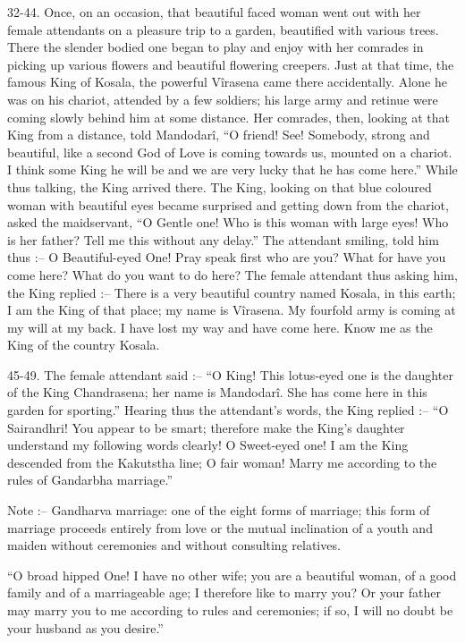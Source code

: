 32-44. Once, on an occasion, that beautiful faced woman went out with her female attendants on a pleasure trip to a garden, beautified with various trees. There the slender bodied one began to play and enjoy with her comrades in picking up various flowers and beautiful flowering creepers. Just at that time, the famous King of Kosala, the powerful V\^irasena came there accidentally. Alone he was on his chariot, attended by a few soldiers; his large army and retinue were coming slowly behind him at some distance. Her comrades, then, looking at that King from a distance, told Mandodar\^i, ``O friend! See! Somebody, strong and beautiful, like a second God of Love is coming towards us, mounted on a chariot. I think some King he will be and we are very lucky that he has come here.'' While thus talking, the King arrived there. The King, looking on that blue coloured woman with beautiful eyes became surprised and getting down from the chariot, asked the maidservant, ``O Gentle one! Who is this woman with large eyes! Who is her father? Tell me this without any delay.'' The attendant smiling, told him thus :-- O Beautiful-eyed One! Pray speak first who are you? What for have you come here? What do you want to do here? The female attendant thus asking him, the King replied :-- There is a very beautiful country named Kosala, in this earth; I am the King of that place; my name is V\^irasena. My fourfold army is coming at my will at my back. I have lost my way and have come here. Know me as the King of the country Kosala.

45-49. The female attendant said :-- ``O King! This lotus-eyed one is the daughter of the King Chandrasena; her name is Mandodar\^i. She has come here in this garden for sporting.'' Hearing thus the attendant's words, the King replied :-- ``O Sairandhri! You appear to be smart; therefore make the King's daughter understand my following words clearly! O Sweet-eyed one! I am the King descended from the Kakutstha line; O fair woman! Marry me according to the rules of Gandarbha marriage.''

Note :-- Gandharva marriage: one of the eight forms of marriage; this form of marriage proceeds entirely from love or the mutual inclination of a youth and maiden without ceremonies and without consulting relatives.

``O broad hipped One! I have no other wife; you are a beautiful woman, of a good family and of a marriageable age; I therefore like to marry you? Or your father may marry you to me according to rules and ceremonies; if so, I will no doubt be your husband as you desire.''

